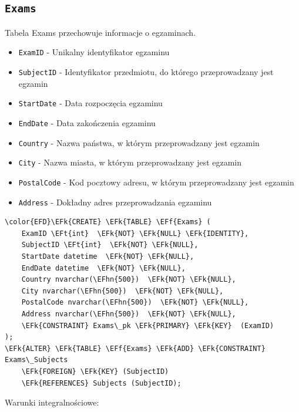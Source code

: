 \documentclass[11pt]{article}
\newcommand{\EFk}[1]{\textcolor{EFk}{\textbf{#1}}} %
\newcommand{\EFf}[1]{\textcolor{EFf}{#1}} %
\newcommand{\EFt}[1]{\textcolor{EFt}{\textbf{#1}}} %
\newcommand{\EFhn}[1]{\textcolor{EFhn}{#1}} %
\begin{document}
\subsection{\texttt{Exams}}
\label{sec:org39f658e}
Tabela Exams przechowuje informacje o egzaminach.
\begin{itemize}
\item \texttt{ExamID} - Unikalny identyfikator egzaminu
\item \texttt{SubjectID} - Identyfikator przedmiotu, do którego przeprowadzany jest egzamin
\item \texttt{StartDate} - Data rozpoczęcia egzaminu
\item \texttt{EndDate} - Data zakończenia egzaminu
\item \texttt{Country} - Nazwa państwa, w którym przeprowadzany jest egzamin
\item \texttt{City} - Nazwa miasta, w którym przeprowadzany jest egzamin
\item \texttt{PostalCode} - Kod pocztowy adresu, w którym przeprowadzany jest egzamin
\item \texttt{Address} - Dokładny adres przeprowadzania egzaminu
\end{itemize}
\begin{Code}
\begin{Verbatim}
\color{EFD}\EFk{CREATE} \EFk{TABLE} \EFf{Exams} (
    ExamID \EFt{int}  \EFk{NOT} \EFk{NULL} \EFk{IDENTITY},
    SubjectID \EFt{int}  \EFk{NOT} \EFk{NULL},
    StartDate datetime  \EFk{NOT} \EFk{NULL},
    EndDate datetime  \EFk{NOT} \EFk{NULL},
    Country nvarchar(\EFhn{500})  \EFk{NOT} \EFk{NULL},
    City nvarchar(\EFhn{500})  \EFk{NOT} \EFk{NULL},
    PostalCode nvarchar(\EFhn{500})  \EFk{NOT} \EFk{NULL},
    Address nvarchar(\EFhn{500})  \EFk{NOT} \EFk{NULL},
    \EFk{CONSTRAINT} Exams\_pk \EFk{PRIMARY} \EFk{KEY}  (ExamID)
);
\EFk{ALTER} \EFk{TABLE} \EFf{Exams} \EFk{ADD} \EFk{CONSTRAINT} Exams\_Subjects
    \EFk{FOREIGN} \EFk{KEY} (SubjectID)
    \EFk{REFERENCES} Subjects (SubjectID);
\end{Verbatim}
\end{Code}
Warunki integralnościowe:
\end{document}
